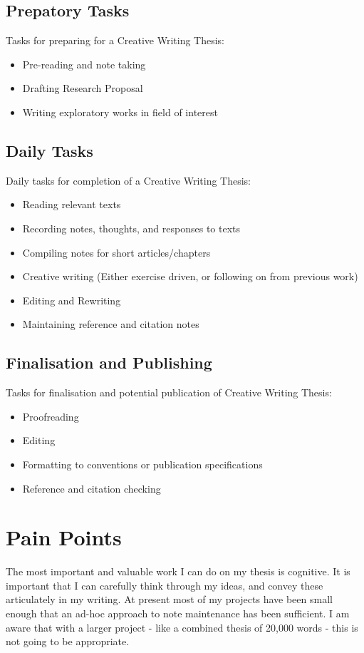 \documentclass{article}
\begin{document}
\subsection{Prepatory Tasks}
Tasks for preparing for a Creative Writing Thesis:
\begin{itemize}
    \item Pre-reading and note taking
    \item Drafting Research Proposal
    \item Writing exploratory works in field of interest
\end{itemize}

\subsection{Daily Tasks}
Daily tasks for completion of a Creative Writing Thesis:
\begin{itemize}
    \item Reading relevant texts
    \item Recording notes, thoughts, and responses to texts
    \item Compiling notes for short articles/chapters
    \item Creative writing (Either exercise driven, or following on from previous work)
    \item Editing and Rewriting
    \item Maintaining reference and citation notes
\end{itemize}

\subsection{Finalisation and Publishing}
Tasks for finalisation and potential publication of Creative Writing Thesis:
\begin{itemize}
    \item Proofreading
    \item Editing
    \item Formatting to conventions or publication specifications
    \item Reference and citation checking
    \end{itemize}

\section{Pain Points}
The most important and valuable work I can do on my thesis is cognitive. It is important that I can carefully think through my ideas, and convey these articulately in my writing. 
At present most of my projects have been small enough that an ad-hoc approach to note maintenance has been sufficient. I am aware that with a larger project - like a combined thesis of
20,000 words - this is not going to be appropriate.
\end{document}
